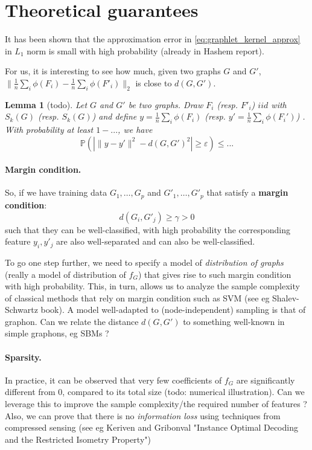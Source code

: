 \documentclass{article}
\newtheorem{lemma}{Lemma}
\begin{document}
\section{Theoretical guarantees}

It has been shown that the approximation error in \eqref{eq:graphlet_kernel_approx} in $L_1$ norm is small with high probability (already in Hashem report).

For us, it is interesting to see how much, given two graphs $G$ and $G'$, $\|\frac{1}{n} \sum_i \phi(F_i) - \frac{1}{n} \sum_i \phi(F'_i)\|_2$ is close to $d(G,G')$.
\begin{lemma}[todo]
Let $G$ and $G'$ be two graphs. Draw $F_i$ (resp. $F'_i$) $iid$ with $S_k(G)$ (resp. $S_k(G)$) and define $y =\frac{1}{n} \sum_i \phi(F_i)$ (resp. $y' = \frac{1}{n} \sum_i \phi(F_i')$) . With probability at least $1-...$, we have
\[
\mathbb{P}(|\|y-y'\|^2 - d(G,G')^2| \geq \varepsilon) \leq ...
\]
\end{lemma}

\paragraph{Margin condition.} So, if we have training data $G_1, \ldots, G_p$ and $G'_1, \ldots, G'_p$ that satisfy a \textbf{margin condition}:
\[
d(G_i, G'_j) \geq \gamma >0
\]
such that they can be well-classified, with high probability the corresponding feature $y_i, y'_j$ are also well-separated and can also be well-classified.

To go one step further, we need to specify a model of \emph{distribution of graphs} (really a model of distribution of $f_G$) that gives rise to such margin condition with high probability. This, in turn, allows us to analyze the sample complexity of classical methods that rely on margin condition such as SVM (see eg Shalev-Schwartz book). A model well-adapted to (node-independent) sampling is that of graphon. Can we relate the distance $d(G,G')$ to something well-known in simple graphons, eg SBMs ?

\paragraph{Sparsity.} In practice, it can be observed that very few coefficients of $f_G$ are significantly different from $0$, compared to its total size (todo: numerical illustration). Can we leverage this to improve the sample complexity/the required number of features ? Also, we can prove that there is no \emph{information loss} using techniques from compressed sensing (see eg Keriven and Gribonval "Instance Optimal Decoding and the Restricted Isometry Property")
\end{document}
